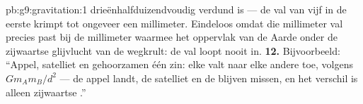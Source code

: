 \begin{solution}{pb:g9:gravitation:1}
drieënhalfduizendvoudig verdund is --- de val van
vijf  in de eerste  krimpt tot ongeveer een
millimeter. Eindeloos omdat die millimeter val precies past bij de
millimeter waarmee het oppervlak van de Aarde onder de zijwaartse glijvlucht
van de  wegkrult: de val loopt nooit in.
\textbf{12.} Bijvoorbeeld: ``Appel, satelliet en 
gehoorzamen één zin: elke  valt naar elke andere toe,
volgens $G m_A m_B / d^2$ --- de appel landt, de satelliet en de
 blijven missen, en het verschil is alleen zijwaartse
.''
\end{solution}
